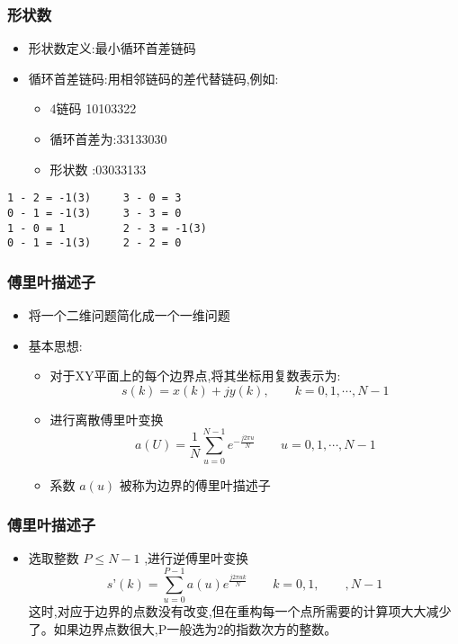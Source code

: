\documentclass{beamer}
\begin{document}
\begin{frame}[fragile]
\frametitle{形状数}
\label{sec-3-4}

\begin{itemize}
\item 形状数定义:最小循环首差链码
\item 循环首差链码:用相邻链码的差代替链码,例如:
\begin{itemize}
\item 4链码 10103322
\item 循环首差为:33133030
\item 形状数 :03033133
\end{itemize}
\end{itemize}

\begin{verbatim}
1 - 2 = -1(3)     3 - 0 = 3
0 - 1 = -1(3)     3 - 3 = 0
1 - 0 = 1         2 - 3 = -1(3)
0 - 1 = -1(3)     2 - 2 = 0
\end{verbatim}
\end{frame}
\begin{frame}
\frametitle{傅里叶描述子}
\label{sec-3-5}

\begin{itemize}
\item 将一个二维问题简化成一个一维问题
\item 基本思想:
\begin{itemize}
\item 对于XY平面上的每个边界点,将其坐标用复数表示为: 
       \[ s(k) = x(k) + jy(k),\qquad  k=0,1,\cdots,N-1 \]
\item 进行离散傅里叶变换
          \[ a(U) = \frac{1}{N}\sum_{u=0}^{N-1}e^{-\frac{j2\pi u}{N} }\qquad  u=0,1,\cdots,N-1 \]
\item 系数 $a(u)$ 被称为边界的傅里叶描述子
\end{itemize}
\end{itemize}
\end{frame}
\begin{frame}
\frametitle{傅里叶描述子}
\label{sec-3-6}

\begin{itemize}
\item 选取整数 $P\leq N-1$ ,进行逆傅里叶变换
   \[ s’(k) = \sum_{u=0}^{P-1}a(u)e^{\frac{j2\pi uk}{N}}\qquad k=0,1,\qquad,N-1\]
    这时,对应于边界的点数没有改变,但在重构每一个点所需要的计算项大大减少了。如果边界点数很大,P一般选为2的指数次方的整数。
\end{itemize}
\end{frame}
\end{document}
